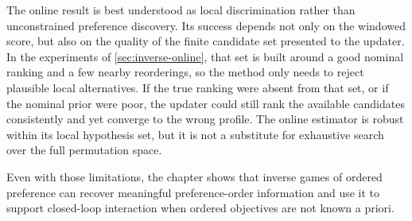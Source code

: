 The online result is best understood as local discrimination rather than unconstrained preference
discovery. Its success depends not only on the windowed score, but also on the quality of the
finite candidate set presented to the updater. In the experiments of \cref{sec:inverse-online},
that set is built around a good nominal ranking and a few nearby reorderings, so the method only
needs to reject plausible local alternatives. If the true ranking were absent from that set, or if
the nominal prior were poor, the updater could still rank the available candidates consistently and
yet converge to the wrong profile. The online estimator is robust within its local hypothesis set,
but it is not a substitute for exhaustive search over the full permutation space.

Even with those limitations, the chapter shows that inverse games of ordered preference can recover meaningful
preference-order information and use it to support closed-loop interaction when ordered objectives are not known
a priori.
